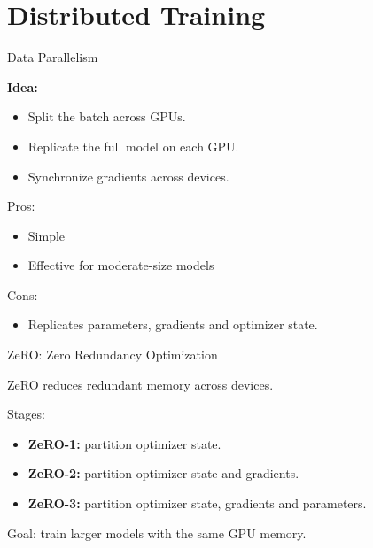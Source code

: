 \documentclass[aspectratio=169]{beamer}
\begin{document}
\section{Distributed Training}

\begin{frame}{Data Parallelism}

\textbf{Idea:}

\begin{itemize}
    \item Split the batch across GPUs.
    \item Replicate the full model on each GPU.
    \item Synchronize gradients across devices.
\end{itemize}

\vspace{0.5cm}

Pros:

\begin{itemize}
    \item Simple
    \item Effective for moderate-size models
\end{itemize}

Cons:

\begin{itemize}
    \item Replicates parameters, gradients and optimizer state.
\end{itemize}

\end{frame}

\begin{frame}{ZeRO: Zero Redundancy Optimization}

ZeRO reduces redundant memory across devices.

\vspace{0.5cm}

Stages:

\begin{itemize}
    \item \textbf{ZeRO-1:} partition optimizer state.
    \item \textbf{ZeRO-2:} partition optimizer state and gradients.
    \item \textbf{ZeRO-3:} partition optimizer state, gradients and parameters.
\end{itemize}

\vspace{0.5cm}

Goal: train larger models with the same GPU memory.

\end{frame}
\end{document}
